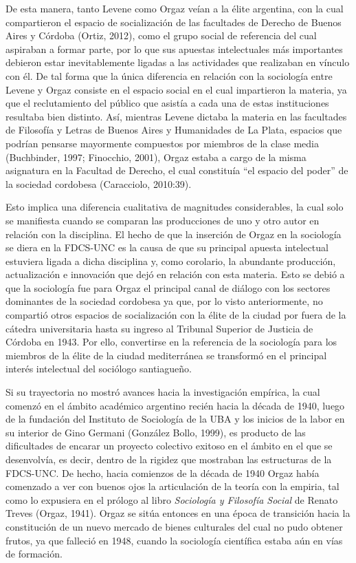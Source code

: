 De esta manera, tanto Levene como Orgaz veían a la élite argentina, con la cual compartieron el espacio de socialización de las facultades de Derecho de Buenos Aires y Córdoba \parencite{277-AGUERO2017}(Ortiz, 2012), como el grupo social de referencia del cual aspiraban a formar parte, por lo que sus apuestas intelectuales más importantes debieron estar inevitablemente ligadas a las actividades que realizaban en vínculo con él. De tal forma que la única diferencia en relación con la sociología entre Levene y Orgaz consiste en el espacio social en el cual impartieron la materia, ya que el reclutamiento del público que asistía a cada una de estas instituciones resultaba bien distinto. Así, mientras Levene dictaba la materia en las facultades de Filosofía y Letras de Buenos Aires y Humanidades de La Plata, espacios que podrían pensarse mayormente compuestos por miembros de la clase media (Buchbinder, 1997; Finocchio, 2001), Orgaz estaba a cargo de la misma asignatura en la Facultad de Derecho, el cual constituía ``el espacio del poder'' de la sociedad cordobesa (Caracciolo, 2010:39).

Esto implica una diferencia cualitativa de magnitudes considerables, la cual solo se manifiesta cuando se comparan las producciones de uno y otro autor en relación con la disciplina. El hecho de que la inserción de Orgaz en la sociología se diera en la FDCS-UNC es la causa de que su principal apuesta intelectual estuviera ligada a dicha disciplina y, como corolario, la abundante producción, actualización e innovación que dejó en relación con esta materia. Esto se debió a que la sociología fue para Orgaz el principal canal de diálogo con los sectores dominantes de la sociedad cordobesa ya que, por lo visto anteriormente, no compartió otros espacios de socialización con la élite de la ciudad por fuera de la cátedra universitaria hasta su ingreso al Tribunal Superior de Justicia de Córdoba en 1943. Por ello, convertirse en la referencia de la sociología para los miembros de la élite de la ciudad mediterránea se transformó en el principal interés intelectual del sociólogo santiagueño.

Si su trayectoria no mostró avances hacia la investigación empírica, la cual comenzó en el ámbito académico argentino recién hacia la década de 1940, luego de la fundación del Instituto de Sociología de la UBA y los inicios de la labor en su interior de Gino Germani (González Bollo, 1999), es producto de las dificultades de encarar un proyecto colectivo exitoso en el ámbito en el que se desenvolvía, es decir, dentro de la rigidez que mostraban las estructuras de la FDCS-UNC. De hecho, hacia comienzos de la década de 1940 Orgaz había comenzado a ver con buenos ojos la articulación de la teoría con la empiria, tal como lo expusiera en el prólogo al libro \emph{Sociología y Filosofía Social} de Renato Treves (Orgaz, 1941). Orgaz se sitúa entonces en una época de transición hacia la constitución de un nuevo mercado de bienes culturales del cual no pudo obtener frutos, ya que falleció en 1948, cuando la sociología científica estaba aún en vías de formación.

